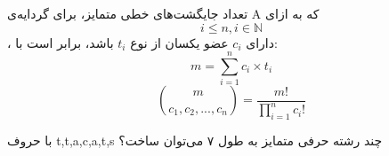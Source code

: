 
\begin{THEOREM}
    \p
    تعداد جایگشت‌های خطی متمایز، برای گردایه‌ی
    A
    که به ازای
    $$i \leq n , i \in \mathbb{N}$$،
    دارای
    $c_i$
    عضو یکسان از نوع
    $t_i$
    باشد، برابر است با: 
    $$m = \sum\limits_{i=1}^n c_i \times t_i$$
    $${m \choose c_1,c_2,...,c_n} = \frac{m!}{\prod\limits_{i=1}^n c_i!}$$
\end{THEOREM}

\begin{PROBLEM}
    \p
    با حروف
    t,t,a,c,a,t,s
    چند رشته حرفی متمایز به طول ۷ می‌توان ساخت؟

\end{PROBLEM}